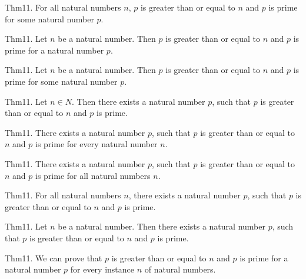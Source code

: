 \documentclass{article}
\begin{document}
Thm11. For all natural numbers $n$, $p$ is greater than or equal to $n$ and $p$ is prime for some natural number $p$.

Thm11. Let $n$ be a natural number. Then $p$ is greater than or equal to $n$ and $p$ is prime for a natural number $p$.

Thm11. Let $n$ be a natural number. Then $p$ is greater than or equal to $n$ and $p$ is prime for some natural number $p$.

Thm11. Let $n \in N$. Then there exists a natural number $p$, such that $p$ is greater than or equal to $n$ and $p$ is prime.

Thm11. There exists a natural number $p$, such that $p$ is greater than or equal to $n$ and $p$ is prime for every natural number $n$.

Thm11. There exists a natural number $p$, such that $p$ is greater than or equal to $n$ and $p$ is prime for all natural numbers $n$.

Thm11. For all natural numbers $n$, there exists a natural number $p$, such that $p$ is greater than or equal to $n$ and $p$ is prime.

Thm11. Let $n$ be a natural number. Then there exists a natural number $p$, such that $p$ is greater than or equal to $n$ and $p$ is prime.

Thm11. We can prove that $p$ is greater than or equal to $n$ and $p$ is prime for a natural number $p$ for every instance $n$ of natural numbers.
\end{document}
